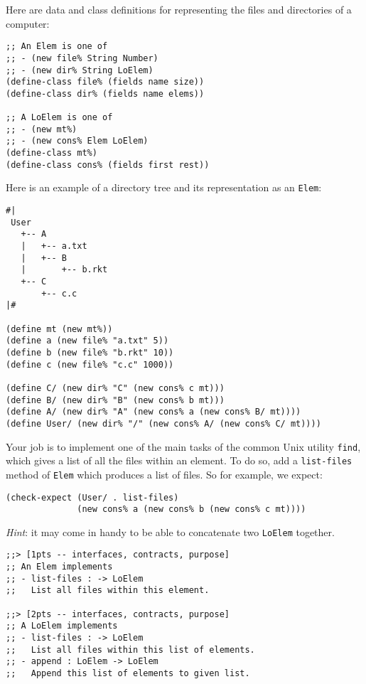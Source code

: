 \documentclass[12pt]{article}                   %
\def\pts#1{\marginpar{\footnotesize \raggedright  \fbox{#1 {\sc Points}}}}
\newenvironment{solution}{}{}
\begin{document}
\begin{problem} \pts{15}

Here are data and class definitions for representing the files and
directories of a computer:

\begin{verbatim}
;; An Elem is one of
;; - (new file% String Number)
;; - (new dir% String LoElem)
(define-class file% (fields name size))
(define-class dir% (fields name elems))

;; A LoElem is one of
;; - (new mt%)
;; - (new cons% Elem LoElem)
(define-class mt%)
(define-class cons% (fields first rest))    
\end{verbatim}


\noindent
Here is an example of a directory tree and its representation as an
\verb|Elem|:
\begin{verbatim}
#|
 User
   +-- A
   |   +-- a.txt
   |   +-- B
   |       +-- b.rkt
   +-- C
       +-- c.c
|#

(define mt (new mt%))
(define a (new file% "a.txt" 5))
(define b (new file% "b.rkt" 10))
(define c (new file% "c.c" 1000))

(define C/ (new dir% "C" (new cons% c mt)))
(define B/ (new dir% "B" (new cons% b mt)))
(define A/ (new dir% "A" (new cons% a (new cons% B/ mt))))
(define User/ (new dir% "/" (new cons% A/ (new cons% C/ mt))))
\end{verbatim}

\newpage
\noindent
Your job is to implement one of the main tasks of the common Unix
utility \verb|find|, which gives a list of all the files within an
element.  To do so, add a \verb|list-files| method of \verb|Elem|
which produces a list of files.  So for example, we expect:
\begin{verbatim}
(check-expect (User/ . list-files) 
              (new cons% a (new cons% b (new cons% c mt))))
\end{verbatim}
\emph{Hint}: it may come in handy to be able to concatenate two
\verb|LoElem| together.

\ifrubric
\else
{}
\fi

\begin{solution}
\begin{verbatim}
;;> [1pts -- interfaces, contracts, purpose]
;; An Elem implements
;; - list-files : -> LoElem
;;   List all files within this element.

;;> [2pts -- interfaces, contracts, purpose]
;; A LoElem implements
;; - list-files : -> LoElem
;;   List all files within this list of elements.
;; - append : LoElem -> LoElem
;;   Append this list of elements to given list.


\end{verbatim}
\end{solution}
\end{problem}
\end{document}
